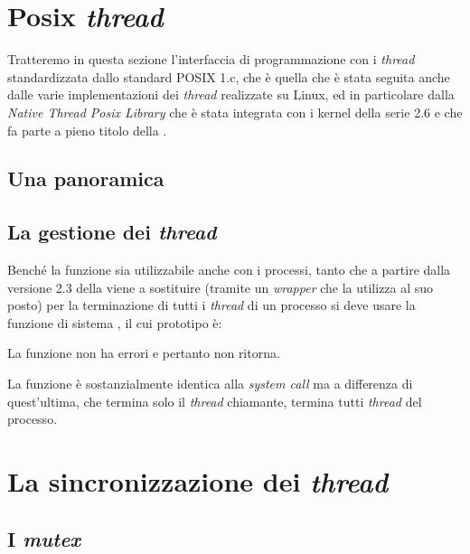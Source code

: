 

\section{Posix \textit{thread}}
\label{sec:thread_posix_intro}


Tratteremo in questa sezione l'interfaccia di programmazione con i
\textit{thread} standardizzata dallo standard POSIX 1.c, che è quella che è
stata seguita anche dalle varie implementazioni dei \textit{thread} realizzate
su Linux, ed in particolare dalla \textit{Native Thread Posix Library} che è
stata integrata con i kernel della serie 2.6 e che fa parte a pieno titolo
della .


\subsection{Una panoramica}
\label{sec:pthread_overview}


\subsection{La gestione dei \textit{thread}}
\label{sec:pthread_management}


Benché la funzione sia utilizzabile anche con i processi, tanto che a partire
dalla versione 2.3 della  viene a sostituire  (tramite
un \textit{wrapper} che la utilizza al suo posto) per la terminazione di tutti
i \textit{thread} di un processo si deve usare la funzione di sistema
, il cui prototipo è:

\begin{funcproto}{
}
{La funzione non ha errori e pertanto non ritorna.}
\end{funcproto}

La funzione è sostanzialmente identica alla \textit{system call} 
ma a differenza di quest'ultima, che termina solo il \textit{thread}
chiamante, termina tutti \textit{thread} del processo. 


\section{La sincronizzazione dei \textit{thread}}
\label{sec:pthread_sync}

\subsection{I \textit{mutex}}
\label{sec:pthread_mutex}


